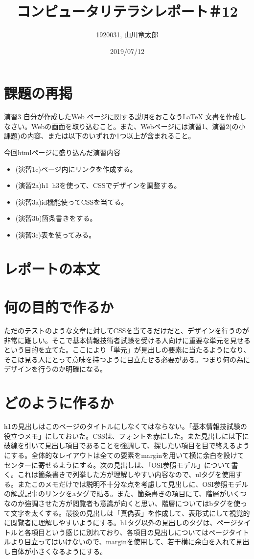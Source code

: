\documentclass[12pt,a4j]{jarticle}
\begin{document}
\title{コンピュータリテラシレポート＃12}
\author{1920031, 山川竜太郎}
\date{2019/07/12}
\maketitle


\section{課題の再掲}
演習3 自分が作成したWeb ページに関する説明をおこなうLaTeX 文書を作成しなさい。Webの画面を取り込むこと。また、Webページには演習1、演習2(の小課題)の内容、または以下のいずれか1つ以上が含まれること。

今回htmlページに盛り込んだ演習内容

\begin{itemize}
  \item (演習1c)ページ内にリンクを作成する。
  \item (演習2a)h1~h3を使って、CSSでデザインを調整する。
  \item (演習3a)id機能使ってCSSを当てる。
  \item (演習3b)箇条書きをする。
  \item (演習3c)表を使ってみる。
\end{itemize}

\section{レポートの本文}

\section{何の目的で作るか}

ただのテストのような文章に対してCSSを当てるだけだと、デザインを行うのが非常に難しい。そこで基本情報技術者試験を受ける人向けに重要な単元を見せるという目的を立てた。ここにより「単元」が見出しの要素に当たるようになり、そこは見る人にとって意味を持つように目立たせる必要がある。つまり何の為にデザインを行うのか明確になる。

\section{どのように作るか}

h1の見出しはこのページのタイトルにしなくてはならない。「基本情報技試験の役立つメモ」にしておいた。CSSは、フォントを赤にした。また見出しには下に破線を引いて見出し項目であることを強調して、探したい項目を目で終えるようにする。全体的なレイアウトは全ての要素をmarginを用いて横に余白を設けてセンターに寄せるようにする。次の見出しは、「OSI参照モデル」について書く。これは箇条書きで列挙した方が理解しやすい内容なので、ulタグを使用する。またこのメモだけでは説明不十分な点を考慮して見出しに、OSI参照モデルの解説記事のリンクをaタグで貼る。また、箇条書きの項目にて、階層がいくつなのか強調させた方が閲覧者も意識が向くと思い、階層についてはbタグを使って文字を太くする。最後の見出しは「真偽表」を作成して、表形式にして視覚的に閲覧者に理解しやすいようにする。h1タグ以外の見出しのタグは、ページタイトルと各項目という感じに別れており、各項目の見出しについてはページタイトルより目立ってはいけないので、marginを使用して、若干横に余白を入れて見出し自体が小さくなるようにする。
\end{document}

